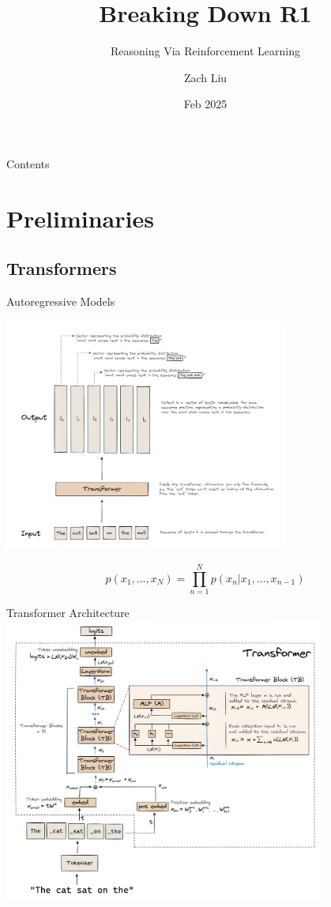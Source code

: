 \documentclass[8pt]{beamer}
\title{Breaking Down R1}
\subtitle{Reasoning Via Reinforcement Learning}
\author[]{Zach Liu}
\institute{CAISH}
\date{Feb 2025}
\begin{document}
\begin{frame}
\titlepage
\end{frame}

\begin{frame}{Contents}
    \tableofcontents
\end{frame}

\section{Preliminaries}

\subsection{Transformers}

\begin{frame}{Autoregressive Models}

\centering
\includegraphics[width=0.7\textwidth]{figures/transformer-overview.png}

{\small
\begin{equation}
p(x_1,\ldots,x_N) = \prod_{n=1}^N p(x_n|x_1,\ldots,x_{n-1})
\end{equation}
}
\end{frame}

\begin{frame}{Transformer Architecture}
\centering
\includegraphics[width=0.8\textwidth]{figures/transformer-arch.png}
\end{frame}
\end{document}

